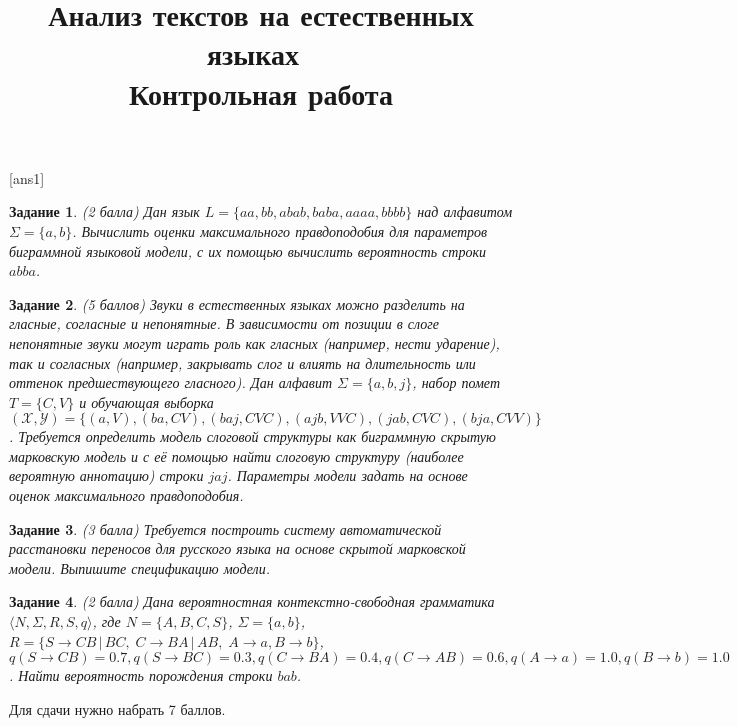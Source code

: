 \documentclass[10pt]{article}
\theoremstyle{example-style}
\newtheorem{example}{Задание}
\begin{document}
 

\title{Анализ текстов на естественных языках\ \\{\large Контрольная работа}}
\author{}
\date{}

\maketitle

[ans1]


\begin{example}
\textit{(2 балла)} Дан язык $L = \{aa, bb, abab, baba, aaaa, bbbb\}$ над алфавитом $\Sigma = \{a, b\}$. Вычислить оценки максимального правдоподобия для параметров биграммной языковой модели, с их помощью вычислить вероятность строки $abba$.
\end{example}

\begin{example}
\textit{(5 баллов)} Звуки в естественных языках можно разделить на гласные, согласные и непонятные. В зависимости от позиции в слоге непонятные звуки могут играть роль как гласных (например, нести ударение), так и согласных (например, закрывать слог и влиять на длительность или оттенок предшествующего гласного). Дан алфавит $\Sigma = \{a, b, j\}$, набор помет $T = \{C, V\}$ и обучающая выборка $(\mathcal{X}, \mathcal{Y}) = \{(a, V), (ba, CV), (baj, CVC), (ajb, VVC), (jab, CVC), (bja, CVV) \}$. Требуется определить модель слоговой структуры как биграммную скрытую марковскую модель и с её помощью найти слоговую структуру (наиболее вероятную аннотацию) строки $jaj$. Параметры модели задать на основе оценок максимального правдоподобия.
\end{example}

\begin{example}
\textit{(3 балла)} Требуется построить систему автоматической расстановки переносов для русского языка на основе скрытой марковской модели. Выпишите спецификацию модели.
\end{example}

\begin{example}
\textit{(2 балла)} Дана вероятностная контекстно-свободная грамматика $\langle N, \Sigma, R, S, q \rangle$, где $N = \{ A, B, C, S \}$, $\Sigma = \{a, b\}$,
$R = \{ S \to CB \, | \, BC, \; C \to BA \, | \, AB, \; A \to a, B \to b \}$, 
$q(S \to CB) = 0.7, q(S \to BC) = 0.3, q(C \to BA) = 0.4, q(C \to AB) = 0.6, q(A \to a) = 1.0, q(B \to b) = 1.0$.
Найти вероятность порождения строки $bab$.
\end{example}


\bigskip
Для сдачи нужно набрать 7 баллов.
\end{document}
